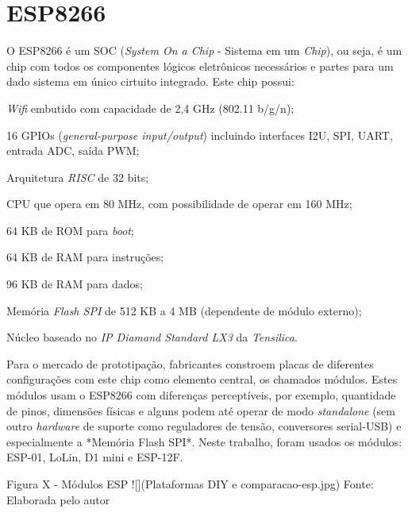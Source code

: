 \section{ESP8266}

O ESP8266 é um SOC (\emph{System On a Chip} - Sistema em um \emph{Chip}),
ou seja, é um chip com todos os componentes lógicos
eletrônicos necessários e partes para um dado sistema em único cirtuito
integrado. Este chip possui:


\begin{alineas}
	\item \emph{Wifi} embutido com capacidade de 2,4 GHz (802.11 b/g/n);

	\item 16 GPIOs (\emph{general-purpose input/output}) incluindo interfaces
 I2U, SPI, UART, entrada ADC, saída PWM;

	\item Arquitetura \emph{RISC} de 32 bits;

	\item CPU que opera em  80 MHz, com possibilidade de operar em 160 MHz;

	\item 64 KB de ROM para \emph{boot};

	\item 64 KB de RAM para instruções;

	\item 96 KB de RAM para dados;

	\item Memória \emph{Flash SPI} de 512 KB a 4 MB (dependente de módulo externo);

	\item Núcleo baseado no \emph{IP Diamand Standard LX3} da \emph{Tensilica}.

\end{alineas}

Para o mercado de prototipação, fabricantes constroem placas de diferentes configurações com
este chip como elemento central, os chamados módulos. Estes módulos usam o
ESP8266 com diferenças perceptíveis, por exemplo, quantidade de pinos, dimensões
físicas e alguns podem até operar de modo \emph{standalone} (sem outro \emph{hardware} de
suporte como reguladores de tensão, conversores serial-USB) e especialmente a *Memória Flash SPI*. Neste trabalho, foram usados os módulos:
ESP-01, LoLin, D1 mini e ESP-12F.


Figura X - Módulos ESP
![](Plataformas DIY e comparacao\modulos-esp.jpg)
Fonte: Elaborada pelo autor

